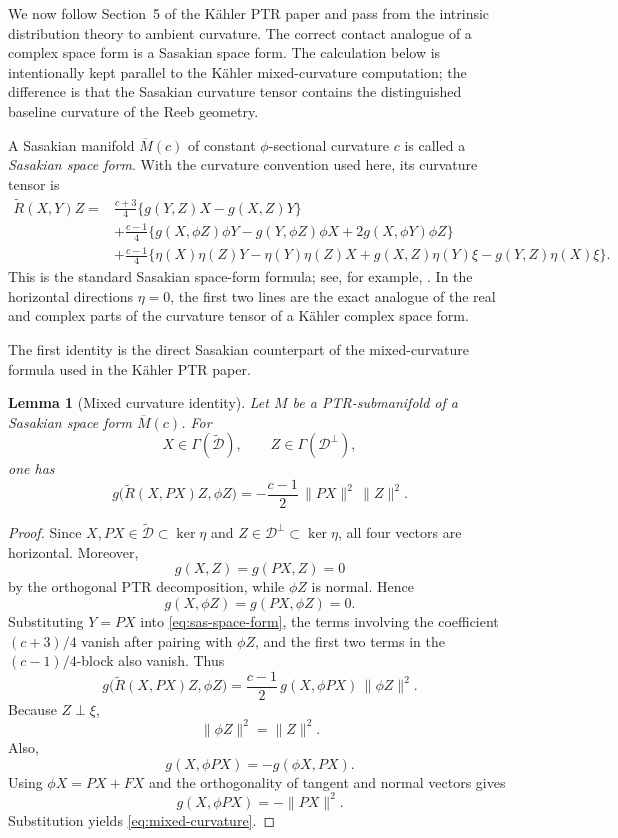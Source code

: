 \documentclass[11pt]{article}
\newtheorem{lemma}[theorem]{Lemma}\newtheorem{corollary}[theorem]{Corollary}
\theoremstyle{definition}\newtheorem{definition}[theorem]{Definition}\newtheorem{example}[theorem]{Example}
\theoremstyle{remark}\newtheorem{remark}[theorem]{Remark}
\newcommand{\Mbar}{\overline M}\newcommand{\Dperp}{\mathcal D^{\perp}}\newcommand{\Dtilde}{\widetilde{\mathcal D}}
\begin{document}
We now follow Section~5 of the K\"ahler PTR paper and pass from the intrinsic distribution theory to ambient curvature.  The correct contact analogue of a complex space form is a Sasakian space form.  The calculation below is intentionally kept parallel to the K\"ahler mixed-curvature computation; the difference is that the Sasakian curvature tensor contains the distinguished baseline curvature of the Reeb geometry.

A Sasakian manifold $\Mbar(c)$ of constant $\phi$-sectional curvature $c$ is called a \emph{Sasakian space form}.  With the curvature convention used here, its curvature tensor is
\begin{align}
\widetilde R(X,Y)Z={}&\frac{c+3}{4}
 \{g(Y,Z)X-g(X,Z)Y\}\nonumber\\
&+\frac{c-1}{4}\{
 g(X,\phi Z)\phi Y-g(Y,\phi Z)\phi X
 +2g(X,\phi Y)\phi Z\}\nonumber\\
&+\frac{c-1}{4}\{
 \eta(X)\eta(Z)Y-\eta(Y)\eta(Z)X
 +g(X,Z)\eta(Y)\xi-g(Y,Z)\eta(X)\xi\}.
\label{eq:sas-space-form}
\end{align}
This is the standard Sasakian space-form formula; see, for example, \cite{Blair2010}.  In the horizontal directions $\eta=0$, the first two lines are the exact analogue of the real and complex parts of the curvature tensor of a K\"ahler complex space form.

The first identity is the direct Sasakian counterpart of the mixed-curvature formula used in the K\"ahler PTR paper.

\begin{lemma}[Mixed curvature identity]\label{lem:mixed-curvature}
Let $M$ be a PTR-submanifold of a Sasakian space form $\Mbar(c)$.  For
\[
 X\in\Gamma(\Dtilde),\qquad Z\in\Gamma(\Dperp),
\]
one has
\begin{equation}\label{eq:mixed-curvature}
 g\bigl(\widetilde R(X,PX)Z,\phi Z\bigr)
 =-\frac{c-1}{2}\,\|PX\|^2\,\|Z\|^2 .
\end{equation}
\end{lemma}

\begin{proof}
Since $X,PX\in\Dtilde\subset\ker\eta$ and $Z\in\Dperp\subset\ker\eta$, all four vectors are horizontal.  Moreover,
\[
 g(X,Z)=g(PX,Z)=0
\]
by the orthogonal PTR decomposition, while $\phi Z$ is normal.  Hence
\[
 g(X,\phi Z)=g(PX,\phi Z)=0.
\]
Substituting $Y=PX$ into \eqref{eq:sas-space-form}, the terms involving the coefficient $(c+3)/4$ vanish after pairing with $\phi Z$, and the first two terms in the $(c-1)/4$-block also vanish.  Thus
\[
 g\bigl(\widetilde R(X,PX)Z,\phi Z\bigr)
 =\frac{c-1}{2}\,g(X,\phi PX)\,\|\phi Z\|^2.
\]
Because $Z\perp\xi$,
\[
 \|\phi Z\|^2=\|Z\|^2.
\]
Also,
\[
 g(X,\phi PX)=-g(\phi X,PX).
\]
Using $\phi X=PX+FX$ and the orthogonality of tangent and normal vectors gives
\[
 g(X,\phi PX)=-\|PX\|^2.
\]
Substitution yields \eqref{eq:mixed-curvature}.
\end{proof}
\end{document}
